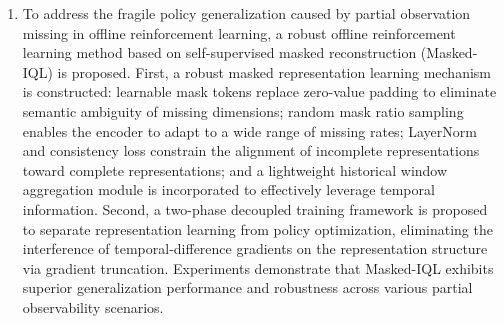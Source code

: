 \begin{englishabstract}
\begin{enumerate}[label=\arabic*)]
    \item To address the fragile policy generalization caused by partial observation missing in offline reinforcement learning, a robust offline reinforcement learning method based on self-supervised masked reconstruction (Masked-IQL) is proposed. First, a robust masked representation learning mechanism is constructed: learnable mask tokens replace zero-value padding to eliminate semantic ambiguity of missing dimensions; random mask ratio sampling enables the encoder to adapt to a wide range of missing rates; LayerNorm and consistency loss constrain the alignment of incomplete representations toward complete representations; and a lightweight historical window aggregation module is incorporated to effectively leverage temporal information. Second, a two-phase decoupled training framework is proposed to separate representation learning from policy optimization, eliminating the interference of temporal-difference gradients on the representation structure via gradient truncation. Experiments demonstrate that Masked-IQL exhibits superior generalization performance and robustness across various partial observability scenarios.
\end{enumerate}



\end{englishabstract}
